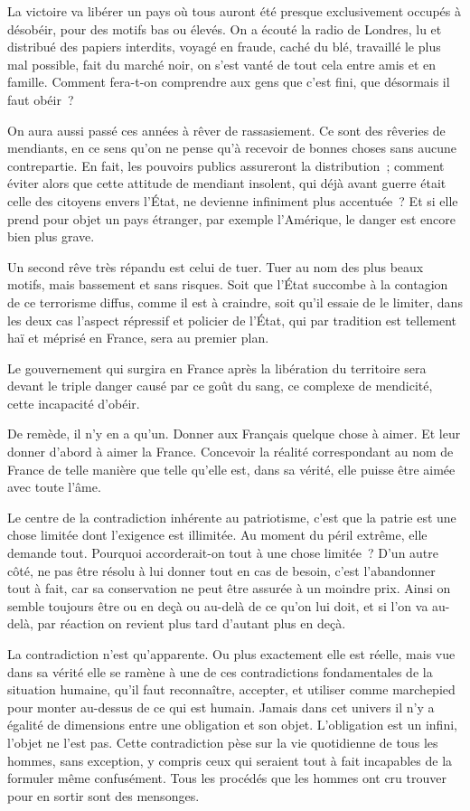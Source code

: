 \documentclass[french,twoside]{book} %
\begin{document}
La victoire va libérer un pays où tous auront été presque exclusivement occupés à désobéir, pour des motifs bas ou élevés. On a écouté la radio de Londres, lu et distribué des papiers interdits, voyagé en fraude, caché du blé, travaillé le plus mal possible, fait du marché noir, on s'est vanté de tout cela entre amis et en famille. Comment fera-t-on comprendre aux gens que c'est fini, que désormais il faut obéir ?\par
On aura aussi passé ces années à rêver de rassasiement. Ce sont des rêveries de mendiants, en ce sens qu'on ne pense qu'à recevoir de bonnes choses sans aucune contrepartie. En fait, les pouvoirs publics assureront la distribution ; comment éviter alors que cette attitude de mendiant insolent, qui déjà avant guerre était celle des citoyens envers l'État, ne devienne infiniment plus accentuée ? Et si elle prend pour objet un pays étranger, par exemple l'Amérique, le danger est encore bien plus grave.\par
Un second rêve très répandu est celui de tuer. Tuer au nom des plus beaux motifs, mais bassement et sans risques. Soit que l'État succombe à la contagion de ce terrorisme diffus, comme il est à craindre, soit qu'il essaie de le limiter, dans les deux cas l'aspect répressif et policier de l'État, qui par tradition est tellement haï et méprisé en France, sera au premier plan.\par
Le gouvernement qui surgira en France après la libération du territoire sera devant le triple danger causé par ce goût du sang, ce complexe de mendicité, cette incapacité d'obéir.\par
De remède, il n'y en a qu'un. Donner aux Français quelque chose à aimer. Et leur donner d'abord à aimer la France. Concevoir la réalité correspondant au nom de France de telle manière que telle qu'elle est, dans sa vérité, elle puisse être aimée avec toute l'âme.\par
Le centre de la contradiction inhérente au patriotisme, c'est que la patrie est une chose limitée dont l'exigence est illimitée. Au moment du péril extrême, elle demande tout. Pourquoi accorderait-on tout à une chose limitée ? D'un autre côté, ne pas être résolu à lui donner tout en cas de besoin, c'est l'abandonner tout à fait, car sa conservation ne peut être assurée à un moindre prix. Ainsi on semble toujours être ou en deçà ou au-delà de ce qu'on lui doit, et si l'on va au-delà, par réaction on revient plus tard d'autant plus en deçà.\par
La contradiction n'est qu'apparente. Ou plus exactement elle est réelle, mais vue dans sa vérité elle se ramène à une de ces contradictions fondamentales de la situation humaine, qu'il faut reconnaître, accepter, et utiliser comme marchepied pour monter au-dessus de ce qui est humain. Jamais dans cet univers il n'y a égalité de dimensions entre une obligation et son objet. L'obligation est un infini, l'objet ne l'est pas. Cette contradiction pèse sur la vie quotidienne de tous les hommes, sans exception, y compris ceux qui seraient tout à fait incapables de la formuler même confusément. Tous les procédés que les hommes ont cru trouver pour en sortir sont des mensonges.\par
\end{document}
